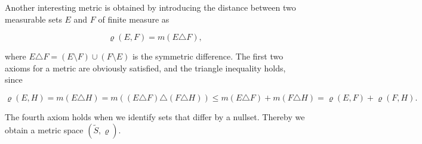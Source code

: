 Another interesting metric is obtained by introducing the distance between two measurable sets $E$ and $F$ of finite measure as

$$\varrho(E, F) = m(E \triangle F),$$

where $E \triangle F = (E \setminus F) \cup (F \setminus E)$ is the symmetric difference. The first two axioms for a metric are obviously satisfied, and the triangle inequality holds, since

$$\varrho(E, H) = m(E \triangle H) = m((E \triangle F) \triangle (F \triangle H)) \leq m(E \triangle F) + m(F \triangle H) = \varrho(E, F) + \varrho(F, H).$$

The fourth axiom holds when we identify sets that differ by a nullset. Thereby we obtain a metric space $(\tilde{S}, \varrho)$.
